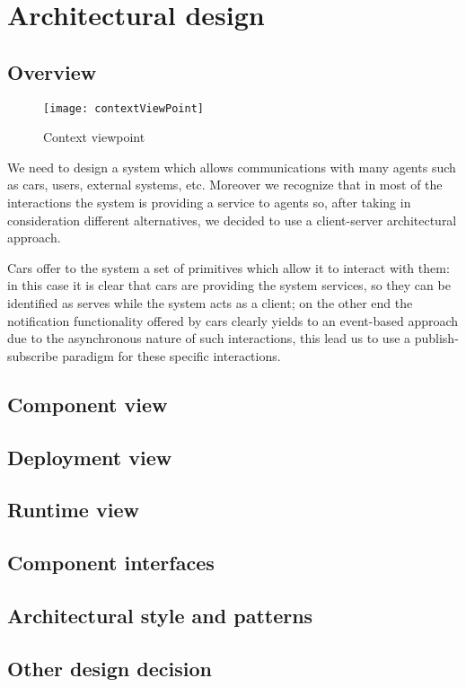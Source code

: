 \section{Architectural design}

\subsection{Overview}

\begin{figure}[h!]
	\centering
	\texttt{[image: contextViewPoint]}
	\caption{
		\label{fig:contextViewPoint} 
		Context viewpoint
	}
\end{figure}
\clearpage



We need to design a system which allows communications with many agents such as cars, users, external systems, etc.
Moreover we recognize that in most of the interactions the system is providing a service to agents so, after taking in consideration different alternatives, we decided to use a client-server architectural approach.

Cars offer to the system a set of primitives which allow it to interact with them: in this case it is clear that cars are providing the system services, so they can be identified as serves while the system acts as a client; on the other end the notification functionality offered by cars clearly yields to an event-based approach due to the asynchronous nature of such interactions, this lead us to use a publish-subscribe paradigm for these specific interactions.

\subsection{Component view}
\subsection{Deployment view}
\subsection{Runtime view}
\subsection{Component interfaces}
\subsection{Architectural style and patterns}
\subsection{Other design decision}